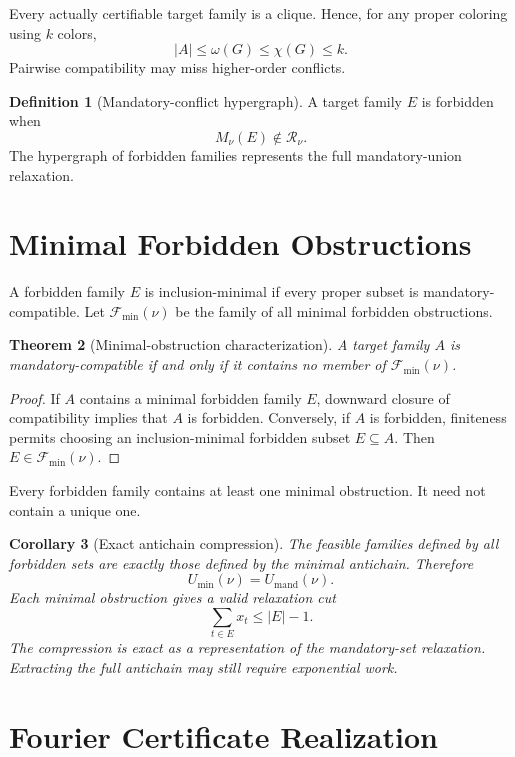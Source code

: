 \documentclass[11pt]{article}
\newtheorem{theorem}{Theorem}[section]
\newtheorem{corollary}[theorem]{Corollary}
\theoremstyle{definition}
\newtheorem{definition}[theorem]{Definition}
\theoremstyle{remark}
\newcommand{\Fmin}{\mathcal{F}_{\min}}
\begin{document}
Every actually certifiable target family is a clique. Hence, for any proper coloring using $k$ colors,
\[
|A|\le\omega(G)\le\chi(G)\le k.
\]
Pairwise compatibility may miss higher-order conflicts.

\begin{definition}[Mandatory-conflict hypergraph]\label{def:conflict-hypergraph}
A target family $E$ is forbidden when
\[
M_\nu(E)\notin\mathcal R_\nu.
\]
The hypergraph of forbidden families represents the full mandatory-union relaxation.
\end{definition}

\section{Minimal Forbidden Obstructions}

A forbidden family $E$ is inclusion-minimal if every proper subset is mandatory-compatible. Let $\Fmin(\nu)$ be the family of all minimal forbidden obstructions.

\begin{theorem}[Minimal-obstruction characterization]\label{thm:minimal-obstruction}
A target family $A$ is mandatory-compatible if and only if it contains no member of $\Fmin(\nu)$.
\end{theorem}

\begin{proof}
If $A$ contains a minimal forbidden family $E$, downward closure of compatibility implies that $A$ is forbidden. Conversely, if $A$ is forbidden, finiteness permits choosing an inclusion-minimal forbidden subset $E\subseteq A$. Then $E\in\Fmin(\nu)$.
\end{proof}

Every forbidden family contains at least one minimal obstruction. It need not contain a unique one.

\begin{corollary}[Exact antichain compression]\label{cor:antichain}
The feasible families defined by all forbidden sets are exactly those defined by the minimal antichain. Therefore
\[
U_{\min}(\nu)=U_{\mathrm{mand}}(\nu).
\]
Each minimal obstruction gives a valid relaxation cut
\[
\sum_{t\in E}x_t\le |E|-1.
\]
The compression is exact as a representation of the mandatory-set relaxation. Extracting the full antichain may still require exponential work.
\end{corollary}

\section{Fourier Certificate Realization}
\end{document}
